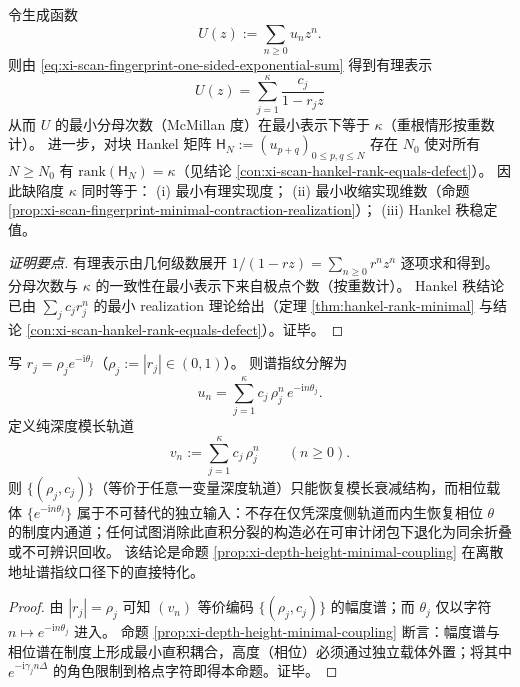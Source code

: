\begin{corollary}\label{cor:xi-scan-fingerprint-mcmillan-degree-hankel-rank}
令生成函数
\[
U(z):=\sum_{n\ge 0}u_n z^n.
\]
则由 \eqref{eq:xi-scan-fingerprint-one-sided-exponential-sum} 得到有理表示
\[
\boxed{\;
U(z)=\sum_{j=1}^{\kappa}\frac{c_j}{1-r_j z}\;}
\]
从而 \(U\) 的最小分母次数（McMillan 度）在最小表示下等于 \(\kappa\)（重根情形按重数计）。
进一步，对块 Hankel 矩阵
\(
\mathsf{H}_N:=(u_{p+q})_{0\le p,q\le N}
\)
存在 \(N_0\) 使对所有 \(N\ge N_0\) 有 \(\mathrm{rank}(\mathsf{H}_N)=\kappa\)（见结论 \ref{con:xi-scan-hankel-rank-equals-defect}）。
因此缺陷度 \(\kappa\) 同时等于：
(i) 最小有理实现度；
(ii) 最小收缩实现维数（命题 \ref{prop:xi-scan-fingerprint-minimal-contraction-realization}）；
(iii) Hankel 秩稳定值。
\end{corollary}
\begin{proof}[证明要点]
有理表示由几何级数展开 \(1/(1-rz)=\sum_{n\ge 0}r^n z^n\) 逐项求和得到。
分母次数与 \(\kappa\) 的一致性在最小表示下来自极点个数（按重数计）。
Hankel 秩结论已由 \(\sum_j c_j r_j^n\) 的最小 realization 理论给出（定理 \ref{thm:hankel-rank-minimal} 与结论 \ref{con:xi-scan-hankel-rank-equals-defect}）。证毕。
\end{proof}

\begin{proposition}\label{prop:xi-scan-depth-height-tensor-factorization}
写 \(r_j=\rho_j e^{-\mathrm{i}\theta_j}\)（\(\rho_j:=|r_j|\in(0,1)\)）。
则谱指纹分解为
\[
u_n=\sum_{j=1}^{\kappa}c_j\,\rho_j^{n}\,e^{-\mathrm{i}n\theta_j}.
\]
定义纯深度模长轨道
\[
v_n:=\sum_{j=1}^{\kappa}c_j\,\rho_j^{n}\qquad(n\ge 0).
\]
则 \(\{(\rho_j,c_j)\}\)（等价于任意一变量深度轨道）只能恢复模长衰减结构，而相位载体 \(\{e^{-\mathrm{i}n\theta_j}\}\) 属于不可替代的独立输入：不存在仅凭深度侧轨道而内生恢复相位 \(\theta\) 的制度内通道；任何试图消除此直积分裂的构造必在可审计闭包下退化为同余折叠或不可辨识回收。
该结论是命题 \ref{prop:xi-depth-height-minimal-coupling} 在离散地址谱指纹口径下的直接特化。
\end{proposition}
\begin{proof}
由 \(|r_j|=\rho_j\) 可知 \((v_n)\) 等价编码 \(\{(\rho_j,c_j)\}\) 的幅度谱；而 \(\theta_j\) 仅以字符 \(n\mapsto e^{-\mathrm{i}n\theta_j}\) 进入。
命题 \ref{prop:xi-depth-height-minimal-coupling} 断言：幅度谱与相位谱在制度上形成最小直积耦合，高度（相位）必须通过独立载体外置；将其中 \(e^{-\mathrm{i}\gamma_j n\Delta}\) 的角色限制到格点字符即得本命题。证毕。
\end{proof}

